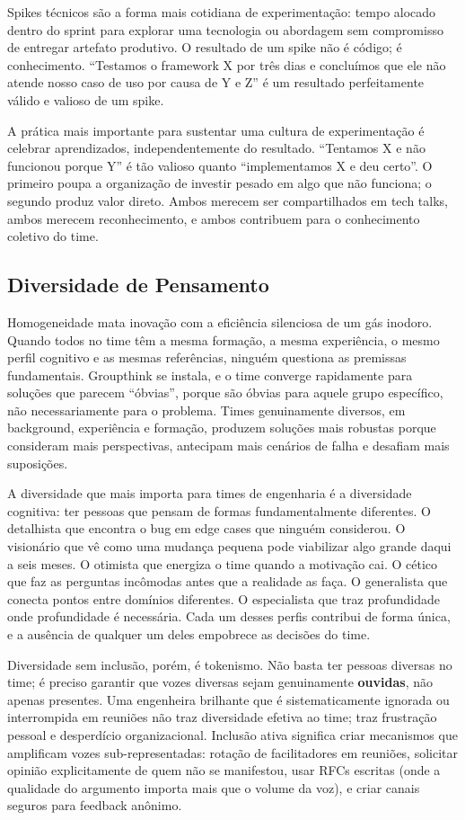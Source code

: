 Spikes técnicos são a forma mais cotidiana de experimentação: tempo alocado
dentro do sprint para explorar uma tecnologia ou abordagem sem compromisso
de entregar artefato produtivo. O resultado de um spike não é código; é
conhecimento. ``Testamos o framework X por três dias e concluímos que ele não
atende nosso caso de uso por causa de Y e Z'' é um resultado perfeitamente
válido e valioso de um spike.

A prática mais importante para sustentar uma cultura de experimentação é
celebrar aprendizados, independentemente do resultado. ``Tentamos X e não
funcionou porque Y'' é tão valioso quanto ``implementamos X e deu certo''.
O primeiro poupa a organização de investir pesado em algo que não funciona;
o segundo produz valor direto. Ambos merecem ser compartilhados em tech
talks, ambos merecem reconhecimento, e ambos contribuem para o conhecimento
coletivo do time.

\subsection{Diversidade de Pensamento}

Homogeneidade mata inovação com a eficiência silenciosa de um gás inodoro.
Quando todos no time têm a mesma formação, a mesma experiência, o mesmo
perfil cognitivo e as mesmas referências, ninguém questiona as premissas
fundamentais. Groupthink se instala, e o time converge rapidamente para
soluções que parecem ``óbvias'', porque são óbvias para aquele grupo
específico, não necessariamente para o problema. Times genuinamente diversos,
em background, experiência e formação, produzem soluções mais robustas
porque consideram mais perspectivas, antecipam mais cenários de falha e
desafiam mais suposições.

A diversidade que mais importa para times de engenharia é a diversidade
cognitiva: ter pessoas que pensam de formas fundamentalmente diferentes. O
detalhista que encontra o bug em edge cases que ninguém considerou. O
visionário que vê como uma mudança pequena pode viabilizar algo grande daqui
a seis meses. O otimista que energiza o time quando a motivação cai. O cético
que faz as perguntas incômodas antes que a realidade as faça. O generalista
que conecta pontos entre domínios diferentes. O especialista que traz
profundidade onde profundidade é necessária. Cada um desses perfis contribui
de forma única, e a ausência de qualquer um deles empobrece as decisões do
time.

Diversidade sem inclusão, porém, é tokenismo. Não basta ter pessoas
diversas no time; é preciso garantir que vozes diversas sejam genuinamente
\textbf{ouvidas}, não apenas presentes. Uma engenheira brilhante que é
sistematicamente ignorada ou interrompida em reuniões não traz diversidade
efetiva ao time; traz frustração pessoal e desperdício organizacional.
Inclusão ativa significa criar mecanismos que amplificam vozes
sub-representadas: rotação de facilitadores em reuniões, solicitar opinião
explicitamente de quem não se manifestou, usar RFCs escritas (onde a
qualidade do argumento importa mais que o volume da voz), e criar canais
seguros para feedback anônimo.

